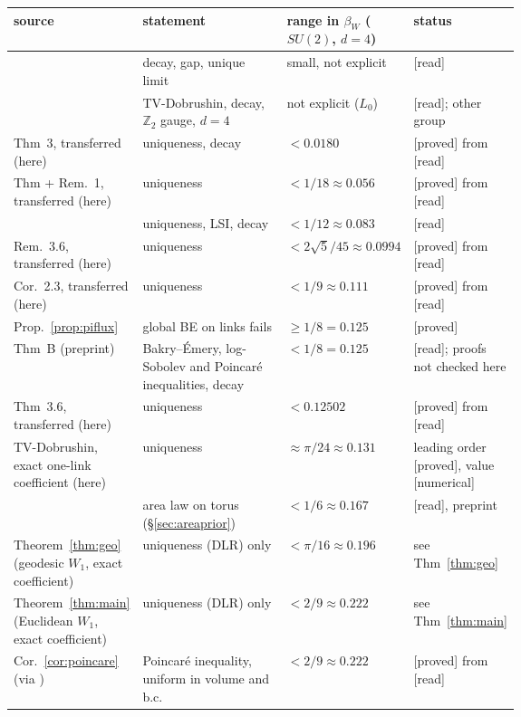 \documentclass[11pt,a4paper]{article}
\theoremstyle{remark}
\theoremstyle{definition}
\theoremstyle{plain}
\theoremstyle{remark}
\newcommand{\st}[1]{\textsf{[#1]}}
\begin{document}
\begin{table}[htbp]
\centering\small
\begin{tabularx}{\linewidth}{@{}>{\raggedright\arraybackslash}p{0.25\linewidth}>{\raggedright\arraybackslash}X>{\raggedright\arraybackslash}p{0.19\linewidth}>{\raggedright\arraybackslash}p{0.21\linewidth}@{}}
\toprule
source & statement & range in $\beta_W$ ($SU(2)$, $d=4$) & status\\
\midrule
\cite{OS78} & decay, gap, unique limit & small, not explicit & \st{read}\\
\cite{Cha20} & TV-Dobrushin, decay, $\mathbb Z_2$ gauge, $d=4$ & not explicit ($L_0$) & \st{read}; other group\\
\cite{Gro79} Thm~3, transferred (here) & uniqueness, decay & $<0.0180$ & \st{proved} from \st{read}\\
\cite{Sim79} Thm + Rem.~1, transferred (here) & uniqueness & $<1/18\approx0.056$ & \st{proved} from \st{read}\\
\cite{SZZ23} & uniqueness, LSI, decay & $<1/12\approx0.083$ & \st{read}\\
\cite{Lev80} Rem.~3.6, transferred (here) & uniqueness & $<2\sqrt5/45\approx0.0994$ & \st{proved} from \st{read}\\
\cite{Roy86} Cor.~2.3, transferred (here) & uniqueness & $<1/9\approx0.111$ & \st{proved} from \st{read}\\
Prop.~\ref{prop:piflux} & global BE on links fails & $\ge1/8=0.125$ & \st{proved}\\
\cite{BB26} Thm~B (preprint) & Bakry--\'Emery, log-Sobolev and Poincar\'e inequalities, decay & $<1/8=0.125$ & \st{read}; proofs not checked here\\
\cite{Roy86} Thm~3.6, transferred (here) & uniqueness & $<0.12502$ & \st{proved} from \st{read}\\
TV-Dobrushin, exact one-link coefficient (here) & uniqueness & $\approx\pi/24\approx0.131$ & leading order \st{proved}, value \st{numerical}\\
\cite{CNS25} & area law on torus (\S\ref{sec:areaprior}) & $<1/6\approx0.167$ & \st{read}, preprint\\
Theorem~\ref{thm:geo} (geodesic $W_1$, exact coefficient) & uniqueness (DLR) only & $<\pi/16\approx0.196$ & see Thm~\ref{thm:geo}\\
Theorem~\ref{thm:main} (Euclidean $W_1$, exact coefficient) & uniqueness (DLR) only & $<2/9\approx0.222$ & see Thm~\ref{thm:main}\\
Cor.~\ref{cor:poincare} (via \cite{Wu06}) & Poincar\'e inequality, uniform in volume and b.c. & $<2/9\approx0.222$ & \st{proved} from \st{read}\\

\end{tabularx}
\end{table}
\end{document}
